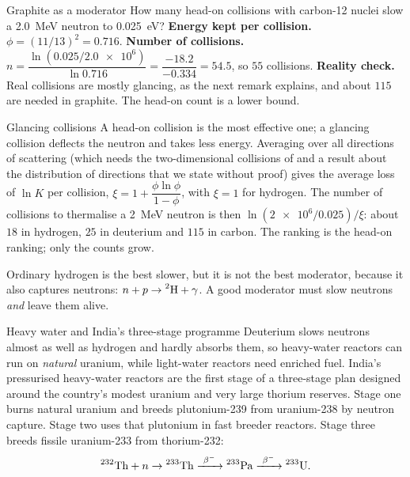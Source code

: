 \begin{figure}[htbp]\centering
{}
\end{figure}

\begin{exbox}{Graphite as a moderator}\label{ex:react-graphite}
How many head-on collisions with carbon-12 nuclei slow a \SI{2.0}{\MeV} neutron to \SI{0.025}{eV}?
 \textbf{Energy kept per collision.} $\phi=(11/13)^2=0.716$.
 \textbf{Number of collisions.}
$n=\dfrac{\ln(0.025/\num{2.0e6})}{\ln 0.716}=\dfrac{-18.2}{-0.334}=54.5$, so $55$ collisions.
 \textbf{Reality check.} Real collisions are mostly glancing, as the next remark explains, and
about $115$ are needed in graphite. The head-on count is a lower bound.
\end{exbox}

\begin{remarkbox}{Glancing collisions}
A head-on collision is the most effective one; a glancing collision deflects the neutron and takes less
energy. Averaging over all directions of scattering (which needs the two-dimensional collisions of
 and a result about the distribution of directions that we state without proof)
gives the average loss of $\ln K$ per collision, $\xi=1+\dfrac{\phi\ln\phi}{1-\phi}$, with $\xi=1$ for
hydrogen. The number of collisions to thermalise a \SI{2}{\MeV} neutron is then
$\ln(\num{2e6}/0.025)/\xi$: about $18$ in hydrogen, $25$ in deuterium and $115$ in carbon. The ranking is
the head-on ranking; only the counts grow.
\end{remarkbox}

Ordinary hydrogen is the best slower, but it is not the best moderator, because it also captures
neutrons: $n+p\to\prescript{2}{}{\mathrm{H}}+\gamma$. A good moderator must slow neutrons \emph{and} leave them alive.

\begin{remarkbox}{Heavy water and India's three-stage programme}
Deuterium slows neutrons almost as well as hydrogen and hardly absorbs them, so heavy-water reactors can
run on \emph{natural} uranium, while light-water reactors need enriched fuel. India's pressurised
heavy-water reactors are the first stage of a three-stage plan designed around the country's modest
uranium and very large thorium reserves. Stage one burns natural uranium and breeds plutonium-239 from
uranium-238 by neutron capture. Stage two uses that plutonium in fast breeder reactors. Stage three
breeds fissile uranium-233 from thorium-232:
\[
\iso{232}{Th}+n\to\iso{233}{Th}\xrightarrow{\ \beta^-\ }\iso{233}{Pa}\xrightarrow{\ \beta^-\ }\iso{233}{U}.
\]
\end{remarkbox}


